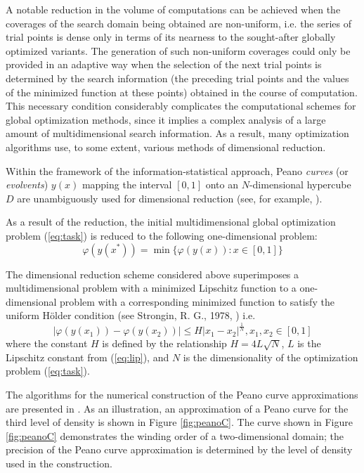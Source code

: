 \documentclass{gOMS2e}
\theoremstyle{plain}%
\theoremstyle{definition}
\theoremstyle{remark}
\begin{document}
A notable reduction in the volume of computations can be achieved when the coverages of the
search domain being obtained are non-uniform, i.e. the series of trial points is dense
only in terms of its nearness to the sought-after globally optimized variants.
The generation of such non-uniform coverages could only be provided in an adaptive
way when the selection of the next trial points is determined by the search information
(the preceding trial points and the values of the minimized function at these points)
obtained in the course of computation. This necessary condition considerably
complicates the computational schemes for global optimization methods, since it
implies a complex analysis of a large amount of multidimensional search information.
As a result, many optimization algorithms use, to some extent, various methods of dimensional reduction.
\par
Within the framework of the information-statistical approach, Peano \textit{curves} (or \textit{evolvents})
\(y(x)\) mapping the interval \([0, 1]\) onto an \(N\)-dimensional hypercube \(D\) are
unambiguously used for dimensional reduction (see, for example, \cite{strSergGO}).
\par
As a result of the reduction, the initial multidimensional global optimization
problem (\ref{eq:task}) is reduced to the following one-dimensional problem:
\begin{equation}
\label{eq:oneDimTask}
\varphi(y(x^*))=\min\{\varphi(y(x)):x\in [0,1]\}
\end{equation}
\par
The dimensional reduction scheme considered above superimposes a multidimensional
problem with a minimized Lipschitz function to a one-dimensional problem with a
corresponding minimized function to satisfy the uniform Hölder condition (see Strongin, R. G., 1978, \cite{strSergGO}) i.e.
\begin{equation}
\label{eq:holder}
|\varphi(y(x_1))-\varphi(y(x_2))|\leqslant H{|x_1-x_2|}^{\frac{1}{N}},x_1,x_2\in[0,1]
\end{equation}
where the constant \(H\) is defined by the relationship \(H=4L\sqrt{N}\), \(L\) is the
Lipschitz constant from (\ref{eq:lip}), and \(N\) is the dimensionality of the optimization problem (\ref{eq:task}).
\par
The algorithms for the numerical construction of the Peano curve approximations are presented in \cite{strSergGO}.
As an illustration, an approximation of a Peano curve for the third level of density is
shown in Figure \ref{fig:peanoC}. The curve shown in Figure \ref{fig:peanoC} demonstrates the winding order of a
two-dimensional domain; the precision of the Peano curve approximation is determined by the
level of density used in the construction.
\end{document}
